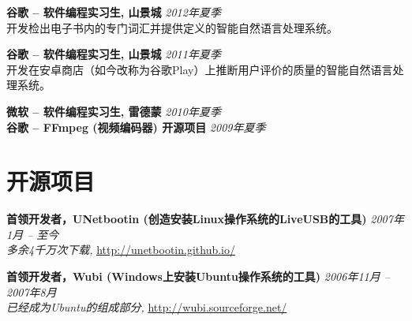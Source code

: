 \documentclass[margin,line]{resume}
\begin{document}
\begin{resume}
\textbf{谷歌 -- 软件编程实习生, 山景城} \hfill \textsl{2012年夏季}\\
开发检出电子书内的专门词汇并提供定义的智能自然语言处理系统。

\textbf{谷歌 -- 软件编程实习生, 山景城} \hfill \textsl{2011年夏季}\\
开发在安卓商店（如今改称为谷歌Play）上推断用户评价的质量的智能自然语言处理系统。

\textbf{微软 -- 软件编程实习生, 雷德蒙} \hfill \textsl{2010年夏季}\\
\textbf{谷歌 -- FFmpeg (视频编码器) 开源项目} \hfill \textsl{2009年夏季}\\



\vspace{-3mm}

\section{\mysidestyle 开源项目}

\textbf{首领开发者，UNetbootin (创造安装Linux操作系统的LiveUSB的工具)} \hfill \textsl{2007年1月 -- 至今}\\
\emph{多余4千万次下载,} \url{http://unetbootin.github.io/}

\textbf{首领开发者，Wubi (Windows上安装Ubuntu操作系统的工具)} \hfill \textsl{2006年11月 -- 2007年8月}\\
\emph{已经成为Ubuntu的组成部分,} \url{http://wubi.sourceforge.net/}


\end{resume}
\end{document}
